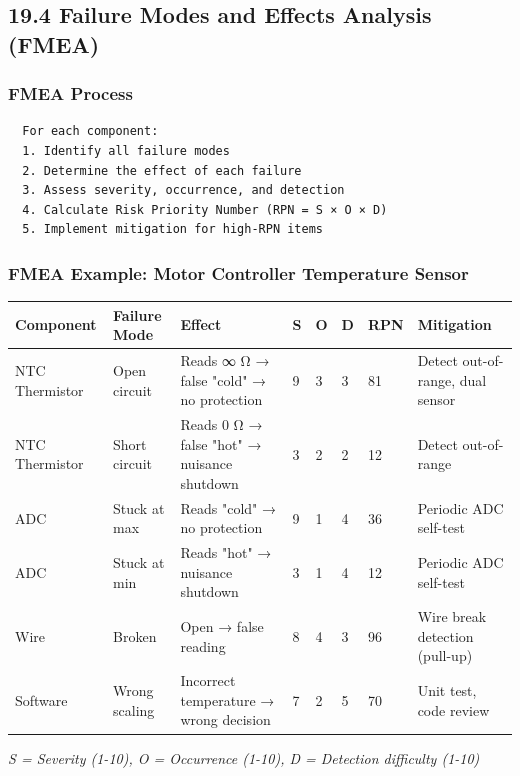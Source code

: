\documentclass[11pt,a4paper]{book}
\begin{document}
\begin{itemize}
\medskip\noindent\hrulefill\medskip

\subsection{19.4 Failure Modes and Effects Analysis (FMEA)}

\subsubsection{FMEA Process}

\begin{lstlisting}
  For each component:
  1. Identify all failure modes
  2. Determine the effect of each failure
  3. Assess severity, occurrence, and detection
  4. Calculate Risk Priority Number (RPN = S × O × D)
  5. Implement mitigation for high-RPN items
\end{lstlisting}

\subsubsection{FMEA Example: Motor Controller Temperature Sensor}

\begin{center}
\begin{tabular}{|l|l|l|l|l|l|l|l|}
\hline
Component & Failure Mode & Effect & S & O & D & RPN & Mitigation \\
\hline
NTC Thermistor & Open circuit & Reads ∞ Ω → false "cold" → no protection & 9 & 3 & 3 & 81 & Detect out-of-range, dual sensor \\
NTC Thermistor & Short circuit & Reads 0 Ω → false "hot" → nuisance shutdown & 3 & 2 & 2 & 12 & Detect out-of-range \\
ADC & Stuck at max & Reads "cold" → no protection & 9 & 1 & 4 & 36 & Periodic ADC self-test \\
ADC & Stuck at min & Reads "hot" → nuisance shutdown & 3 & 1 & 4 & 12 & Periodic ADC self-test \\
Wire & Broken & Open → false reading & 8 & 4 & 3 & 96 & Wire break detection (pull-up) \\
Software & Wrong scaling & Incorrect temperature → wrong decision & 7 & 2 & 5 & 70 & Unit test, code review \\
\hline
\end{tabular}
\end{center}

\textit{S = Severity (1-10), O = Occurrence (1-10), D = Detection difficulty (1-10)}


\end{itemize}
\end{document}
